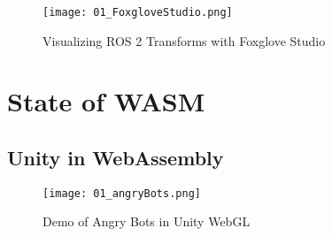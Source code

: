         \begin{figure}[htbp]
            \centering
            \texttt{[image: 01\_FoxgloveStudio.png]}
            \caption{Visualizing ROS 2 Transforms with Foxglove Studio}
        \end{figure}

\section{State of WASM}

    \subsection{Unity in WebAssembly}


    \begin{figure}[htbp]
        \centering
        \texttt{[image: 01\_angryBots.png]}
        \caption{Demo of Angry Bots in Unity WebGL}\label{fig:unity}
    \end{figure}
